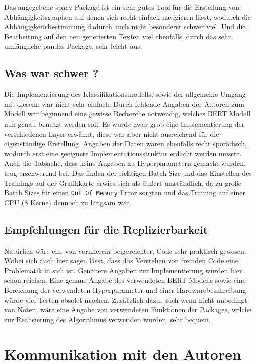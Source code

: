 \documentclass[DIV=13,fontsize=11pt]{scrartcl}
\begin{document}
Das angegebene spacy Package ist ein sehr gutes Tool für die Erstellung von Abhängigkeitsgraphen auf denen sich recht
einfach navigieren lässt, wodurch die Abhängigkeitsbestimmung dadurch auch nicht besonderst schwer viel. Und die Bearbeitung
auf den neu generierten Texten viel ebenfalls, durch das sehr umfängliche pandas Package, sehr leicht aus.

\subsection{Was war schwer ?}
Die Implementierung des Klassifikationsmodells, sowie der allgemeine Umgang mit diesem, war nicht sehr einfach.
Durch fehlende Angaben der Autoren zum Modell war beginnend eine gewisse Recherche notwendig, welches BERT Modell nun genau
benutzt werden soll. Es wurde zwar grob eine Implementierung der verschiedenen Layer erwähnt, diese war aber nicht ausreichend
für die eigenständige Erstellung. Angaben der Daten waren ebenfalls recht sporadisch, wodurch erst eine geeignete Implementationsstruktur
erdacht werden musste. Auch die Tatsache, dass keine Angaben zu Hyperparametern gemacht wurden, trug erschwerend bei. Das finden der richtigen
Batch Size und das Einstellen des Trainings auf der Grafikkarte erwies sich als äußert umständlich, da zu große Batch Sizes für einen
\texttt{Out Of Memory} Error sorgten und das Training auf einer CPU (8 Kerne) dennoch zu langsam war.

\subsection{Empfehlungen für die Replizierbarkeit}
Natürlich wäre ein, von vornherein beigereichter, Code sehr praktisch gewesen. Wobei sich auch hier sagen lässt, dass das Verstehen von
fremden Code eine Problematik in sich ist. Genauere Angaben zur Implementierung würden hier schon reichen. Eine genaue Angabe des verwendeten
BERT Modells sowie eine Bereichung der verwendeten Hyperparameter und einer Hardwarebeschreibung würde viel Testen obsolet machen.
Zusätzlich dazu, auch wenn nicht unbedingt von Nöten, wäre eine Angabe von verwendeten Funktionen der Packages, welche zur Realisierung
des Algorithmus verwenden wurden, sehr bequem.

\section{Kommunikation mit den Autoren}
\end{document}
